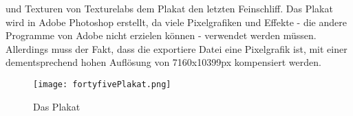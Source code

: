  und  Texturen von Texturelabs dem Plakat den letzten Feinschliff. Das Plakat wird in Adobe Photoshop erstellt, da viele Pixelgrafiken und Effekte - die andere Programme von Adobe nicht erzielen können - verwendet werden müssen. Allerdings muss der Fakt, dass die exportiere Datei eine Pixelgrafik ist, mit einer dementsprechend hohen Auflösung von 7160x10399px kompensiert werden.

\begin{figure}[H]
    \centering
    \texttt{[image: fortyfivePlakat.png]}
    \caption{Das \FF Plakat}
\end{figure}

\renewcommand{\kapitelautor}{}

